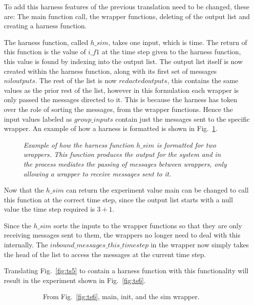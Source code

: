 \documentclass{article}
\begin{document}
To add this harness features of the previous translation need to be changed, these are: The main function call, the wrapper functions, deleting of the output list and creating a harness function. 

The harness function, called $h\_sim$, takes one input, which is time. The return of this function is the value of $i\_f1$ at the time step given to the harness function, this value is found by indexing into the output list. The output list itself is now created within the harness function, along with its first set of messages $niloutputs$. The rest of the list is now $redactedoutputs$, this contains the same values as the prior rest of the list, however in this formulation each wrapper is only passed the messages directed to it. This is because the harness has token over the role of sorting the messages, from the wrapper functions. Hence the input values labeled as $group\_inputs$ contain just the messages sent to the specific wrapper. An example of how a harness is formatted is shown in Fig.~\ref{fig:harn6}.
\begin{figure}[H]
	\centering
	
	\caption{\it Example of how the harness function $h\_sim$ is formatted for two wrappers. This function produces the output for the system and in the process mediates the passing of messages between wrappers, only allowing a wrapper to receive messages sent to it.}
	\label{fig:harn6}
\end{figure} 

Now that the $h\_sim$ can return the experiment value main can be changed to call this function at the correct time step, since the output list starts with a null value the time step required is $3+1$. 

Since the $h\_sim$ sorts the inputs to the wrapper functions so that they are only receiving messages sent to them, the wrappers no longer need to deal with this internally. The $inbound\_messages\_this\_timestep$ in the wrapper now simply takes the head of the list to access the messages at the current time step. 

Translating Fig.~\ref{fig:ts5} to contain a harness function with this functionality will result in the experiment shown in Fig.~\ref{fig:ts6}.
\begin{figure}[H]
	\centering
	\begin{subfigure}[b]{1\textwidth}
	
	\caption{From Fig.~\ref{fig:ts6}, main, init, and the sim wrapper.}
        \label{fig:ts61}
	\end{subfigure}
	\caption*{}
\end{figure}
	
\end{document}
